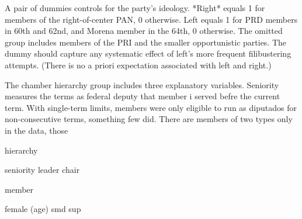 \documentclass[letter,12pt]{article}
\begin{document}
A pair of dummies controls for the party's ideology. *Right* equals 1 for members of the right-of-center PAN, 0 otherwise. Left equals 1 for PRD members in 60th and 62nd, and Morena member in the 64th, 0 otherwise. The omitted group includes members of the PRI and the smaller opportunistic parties. The dummy should capture any systematic effect of left's more frequent filibustering attempts. (There is no a priori expectation associated with left and right.)

The chamber hierarchy group includes three explanatory variables. Seniority measures the terms as federal deputy that member i served befre the current term. With single-term limits, members were only eligible to run as diputados for non-consecutive terms, something few did. There are members of two types only in the data, those  

hierarchy

seniority
leader
chair


member

female
(age)
smd
sup
\end{document}
